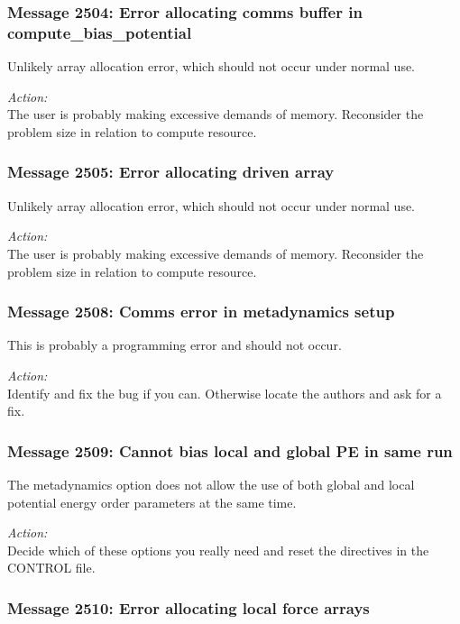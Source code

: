 \subsubsection*{Message 2504: Error allocating comms buffer in 
compute\_bias\_potential}

Unlikely array allocation error, which should not occur under normal use.

\noindent
{\em Action:}\\ The user is probably making excessive demands of
memory. Reconsider the problem size in relation to compute resource.
          
\subsubsection*{Message 2505: Error allocating driven array}
          
Unlikely array allocation error, which should not occur under normal use.

\noindent
{\em Action:}\\ The user is probably making excessive demands of
memory. Reconsider the problem size in relation to compute resource.
          
\subsubsection*{Message 2508: Comms error in metadynamics setup}

This is probably a programming error and should not occur.

\noindent
{\em Action:}\\ Identify and fix the bug if you can. Otherwise locate
the authors and ask for a fix.
          
\subsubsection*{Message 2509: Cannot bias local and global PE in same run}

The metadynamics option does not allow the use of both global and local
potential energy order parameters at the same time.

\noindent
{\em Action:}\\ Decide which of these options you really need and reset the
directives in the CONTROL file.

\subsubsection*{Message 2510: Error allocating local force arrays}
          
